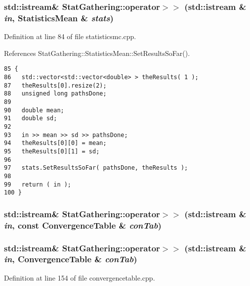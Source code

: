 \subsubsection{\setlength{\rightskip}{0pt plus 5cm}std::istream\& StatGathering::operator$>$$>$ (std::istream \& {\em in}, StatisticsMean \& {\em stats})}\label{namespaceStatGathering_b23aa5d15b648487f59543f3963cb3af}




Definition at line 84 of file statisticsmc.cpp.

References StatGathering::StatisticsMean::SetResultsSoFar().

\begin{Code}\begin{verbatim}85 {
86   std::vector<std::vector<double> > theResults( 1 );
87   theResults[0].resize(2);
88   unsigned long pathsDone;
89 
90   double mean;
91   double sd;
92 
93   in >> mean >> sd >> pathsDone;
94   theResults[0][0] = mean;
95   theResults[0][1] = sd;
96 
97   stats.SetResultsSoFar( pathsDone, theResults );
98  
99   return ( in );
100 }
\end{verbatim}
\end{Code}


\subsubsection{\setlength{\rightskip}{0pt plus 5cm}std::istream\& StatGathering::operator$>$$>$ (std::istream \& {\em in}, const ConvergenceTable \& {\em conTab})}\label{namespaceStatGathering_551658550a1c595b051a8879320c5f6a}


\subsubsection{\setlength{\rightskip}{0pt plus 5cm}std::istream\& StatGathering::operator$>$$>$ (std::istream \& {\em in}, ConvergenceTable \& {\em conTab})}\label{namespaceStatGathering_94a944fd3996cb074c86c6334df181fd}




Definition at line 154 of file convergencetable.cpp.


